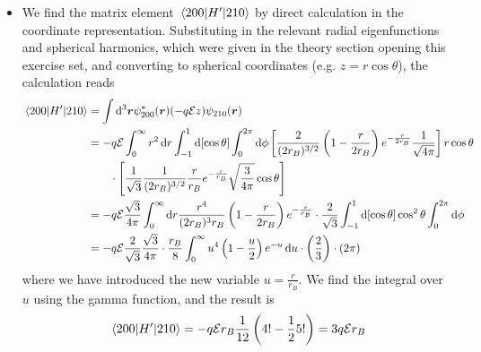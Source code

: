 \documentclass[11pt, a4paper]{article}
\newcommand{\diff}{\mathop{}\!\mathrm{d}} %
\renewcommand{\vec}[1]{\bm{#1}} %
\renewcommand{\r}{\vec{r}}  %
\newcommand{\E}{\mathcal{E}}  %
\begin{document}
\begin{itemize}
	\item We find the matrix element $ \mel{200}{H'}{210} $ by direct calculation in the coordinate representation. Substituting in the relevant radial eigenfunctions and spherical harmonics, which were given in the theory section opening this exercise set, and converting to spherical coordinates (e.g. $ z = r\cos \theta $), the calculation reads
	\begin{align*}
		\mel{200}{H'}{210} &= \int \diff^{3}\vec{r} \psi_{200}^{*}(\r) (-q \E z)\psi_{210}(\r)\\
		& = -q\E\int_{0}^{\infty}r^{2} \diff r \int_{-1}^{1}\diff [\cos \theta] \int_{0}^{2\pi}\diff \phi\left[ \frac{2}{(2r_{B})^{3/2}}\left(1 - \frac{r}{2r_{B}}\right)e^{-\frac{r}{2r_{B}}}\frac{1}{\sqrt{4\pi}}\right] r\cos \theta \\
	 	& {} \qquad \cdot \left[\frac{1}{\sqrt{3}}\frac{1}{(2r_{B})^{3/2}} \frac{r}{r_{B}}e^{-\frac{r}{r_{B}}} \sqrt{\frac{3}{4\pi}} \cos \theta\right]\\
		& = - q \E \frac{\sqrt{3}}{4\pi}\int_{0}^{\infty}\diff r \frac{r^{4}}{(2r_{B})^{3} r_{B}}\left(1 - \frac{r}{2r_{B}}\right)e^{-\frac{r}{r_{B}}} \cdot \frac{2}{\sqrt{3}}\int_{-1}^{1}\diff [\cos \theta] \cos^{2}\theta \int_{0}^{2\pi} \diff \phi\\
		& = -q\E \frac{2}{\sqrt{3}}\frac{\sqrt{3}}{4\pi} \cdot \frac{r_{B}}{8} \int_{0}^{\infty} u^{4}\left(1 - \frac{u}{2}\right)e^{-u} \diff u \cdot \left(\frac{2}{3}\right) \cdot \left(2\pi\right)
	\end{align*}
	where we have introduced the new variable $ u = \frac{r}{r_{B}} $. We find the integral over $ u $ using the gamma function, and the result is
	\begin{equation*}
			\mel{200}{H'}{210} = -q\E r_{B}\frac{1}{12}\left(4! - \frac{1}{2}5!\right) = 3q\E r_{B}
	\end{equation*}
	

\end{itemize}
\end{document}
